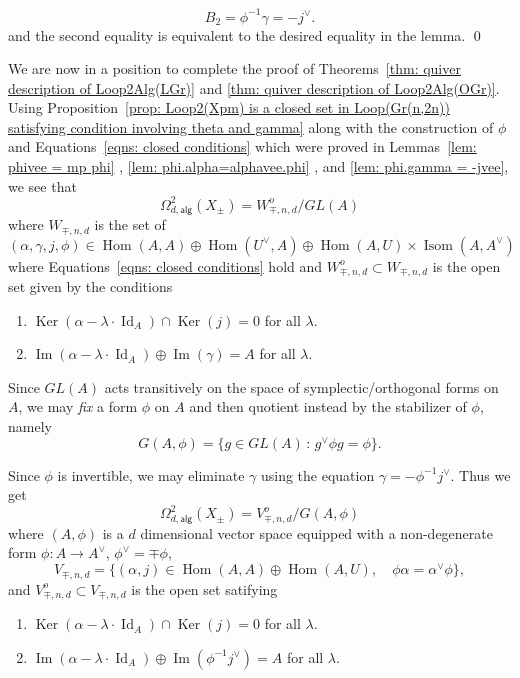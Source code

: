\documentclass{amsart}
\theoremstyle{definition}
\newcommand{\Hom}{\operatorname{Hom}}
\newcommand{\Ker}{\operatorname{Ker}}
\newcommand{\im}{\operatorname{Im}}
\newcommand{\alg}{\mathsf{alg}}
\newcommand{\LoopTwo}{\Omega^{2}_{d,\alg}}
\newcommand{\Id}{\operatorname{Id}}
\newcommand{\Xpm}{X_{\pm}}
\begin{document}
\[
B_{2} = \phi^{-1}\gamma  = -j^{\vee}.
\]
and the second equality is equivalent to the desired equality in the lemma.
\qed 

We are now in a position to complete the proof of Theorems~\ref{thm:
quiver description of Loop2Alg(LGr)} and \ref{thm: quiver description
of Loop2Alg(OGr)}. Using Proposition~\ref{prop: Loop2(Xpm) is a closed set in
Loop(Gr(n,2n)) satisfying condition involving theta and gamma} along
with the construction of $\phi$ and Equations~\eqref{eqns: closed
conditions} which were proved in Lemmas~\ref{lem: phivee = mp phi} ,
\ref{lem: phi.alpha=alphavee.phi} , and \ref{lem: phi.gamma = -jvee},
we see that 
\[
\LoopTwo (\Xpm ) = W^{o}_{\mp,n,d} / GL(A)
\]
where $W_{\mp ,n,d}$ is the set of
\[
(\alpha ,\gamma ,j,\phi )\in \Hom (A,A)\oplus \Hom
(U^{\vee},A)\oplus  \Hom (A,U)\times \operatorname{Isom}(A,A^{\vee})
\]
where Equations~\eqref{eqns: closed conditions} hold and $W^{o}_{\mp
,n,d}\subset W_{\mp ,n,d}$ is the open set given by the conditions

\bigskip

\begin{enumerate}
\item $\Ker (\alpha -\lambda \cdot \Id_{A})\cap \Ker (j) = 0$ for all
$\lambda$.
\item  $\im (\alpha -\lambda \cdot \Id_{A})\oplus  \im (\gamma )=A$ for
all $\lambda$.
\end{enumerate}

\bigskip

Since $GL(A)$ acts transitively on the space of symplectic/orthogonal
forms on $A$, we may \emph{fix} a form $\phi$ on $A$ and then quotient
instead by the stabilizer of $\phi$, namely
\[
G(A,\phi ) = \{g\in GL(A)\,:\, g^{\vee}\phi g=\phi \}.
\]

Since $\phi$ is invertible, we may eliminate $\gamma$ using the
equation $\gamma =-\phi^{-1} j^{\vee}$. Thus we get
\[
\LoopTwo (\Xpm ) = V_{\mp ,n,d}^{o}/G(A,\phi )
\]
where $(A,\phi )$ is a $d$ dimensional vector space equipped with a
non-degenerate form $\phi :A\to A^{\vee}$, $\phi^{\vee}=\mp \phi$,
\[
V_{\mp ,n,d} = \{(\alpha ,j)\in \Hom (A,A)\oplus \Hom (A,U),\quad \phi
\alpha =\alpha^{\vee}\phi \}, 
\]
and $V^{o}_{\mp, n,d}\subset V_{\mp, n,d}$ is the open set satifying

\bigskip

\begin{enumerate}
\item $\Ker (\alpha -\lambda \cdot \Id_{A})\cap \Ker (j) = 0$ for all
$\lambda$.
\item  $\im (\alpha -\lambda \cdot \Id_{A})\oplus  \im (\phi^{-1}j^{\vee} )=A$ for
all $\lambda$.
\end{enumerate}
  
\end{document}

